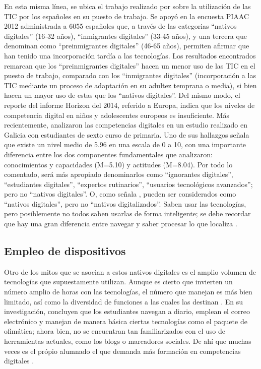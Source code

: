 \documentclass[spanish]{textolivre}
\begin{document}
En esta misma línea, se ubica el trabajo realizado por \textcite{fernandez_enguita_larga_2017} sobre la utilización de las TIC por los españoles en su puesto de trabajo. Se apoyó en la encuesta PIAAC 2012 administrada a 6055 españoles que, a través de las categorias “nativos digitales” (16-32 años), “inmigrantes digitales” (33-45 años), y una tercera que denominan como “preinmigrantes digitales” (46-65 años), permiten afirmar que han tenido una incorporación tardía a las tecnologías. Los resultados encontrados remarcan que los “preinmigrantes digitales” hacen un menor uso de las TIC en el puesto de trabajo, comparado con los “inmigrantes digitales” (incorporación a las TIC mediante un proceso de adaptación en su adultez temprana o media), si bien hacen un mayor uso de estas que los “nativos digitales”. Del mismo modo, el reporte del informe Horizon del 2014, referido a Europa, indica que los niveles de competencia digital en niños y adolescentes europeos es insuficiente. Más recientemente, \textcite{vila-Couñago_2020} analizaron las competencias digitales en un estudio realizado en Galicia con estudiantes de sexto curso de primaria. Uno de sus hallazgos señala que existe un nivel medio de 5.96 en una escala de 0 a 10, con una importante diferencia entre los dos componentes fundamentales que analizaron: conocimientos y capacidades (M=5.10) y actitudes (M=8.04). Por todo lo comentado, será más apropiado denominarlos como “ignorantes digitales”, “estudiantes digitales”, “expertos rutinarios”, “usuarios tecnológicos avanzados”; pero no “nativos digitales”. O, como señala \textcite{granado_palma_educacion_2019}, pueden ser considerados como “nativos digitales”, pero no “nativos digitalizados”. Saben usar las tecnologías, pero posiblemente no todos saben usarlas de forma inteligente; se debe recordar que hay una gran diferencia entre navegar y saber procesar lo que localiza \cite{gazzaley_distracted_2016}.

\subsection{Empleo de dispositivos}

Otro de los mitos que se asocian a estos nativos digitales es el amplio volumen de tecnologías que supuestamente utilizan. Aunque es cierto que invierten un número amplio de horas con las tecnologías, el número que manejan es más bien limitado, así como la diversidad de funciones a las cuales las destinan \cite{lai_technology_2015, castellanos_sanchez_nuevos_2017, prendes_personal_2017, dabbagh_student_2019, lopez_belmonte_alisis_2019, prendes2019university}. En su investigación, \textcite{castellanos_sanchez_nuevos_2017} concluyen que los estudiantes navegan a diario, emplean el correo electrónico y manejan de manera básica ciertas tecnologías como el paquete de ofimática; ahora bien, no se encuentran tan familiarizados con el uso de herramientas actuales, como los blogs o marcadores sociales. De ahí que muchas veces es el própio alumnado el que demanda más formación en competencias digitales \cite{lopez2019perfil}.
\end{document}
